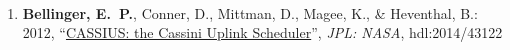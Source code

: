     
\vspace{2\baselineskip}

\\
\begin{enumerate}
    \item \textbf{Bellinger, E.~P.}, Conner, D., Mittman, D., Magee, K., \& Heventhal, B.: 2012,
    ``\href{https://trs.jpl.nasa.gov/handle/2014/43122}{CASSIUS: the Cassini Uplink Scheduler}'', 
    \emph{JPL: NASA}, hdl:2014/43122
\end{enumerate}
